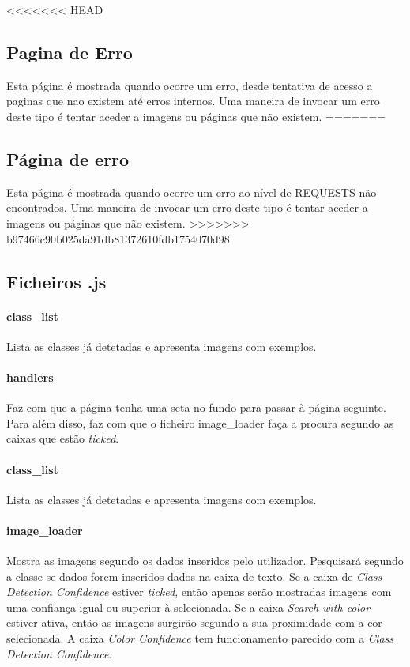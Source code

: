 \documentclass{report}
\begin{document}
<<<<<<< HEAD
\subsection{Pagina de Erro}
Esta página é mostrada quando ocorre um erro, desde tentativa de acesso a paginas que nao existem até erros internos.
Uma maneira de invocar um erro deste tipo é tentar aceder a imagens ou páginas que não existem. 
=======
\subsection{Página de erro}
Esta página é mostrada quando ocorre um erro ao nível de REQUESTS não encontrados. Uma maneira de invocar um erro deste tipo é tentar aceder a imagens ou páginas que não existem. 
>>>>>>> b97466c90b025da91db81372610fdb1754070d98

\subsection{Ficheiros .js}
\paragraph{class\_list}  Lista as classes já detetadas e apresenta imagens com exemplos.
\paragraph{handlers} Faz com que a página tenha uma seta no fundo para passar à página seguinte. Para além disso, faz com que o ficheiro image\_loader faça a procura segundo as caixas que estão \textit{ticked}.
\paragraph{class\_list}  Lista as classes já detetadas e apresenta imagens com exemplos.
\paragraph{image\_loader}Mostra as imagens segundo os dados inseridos pelo utilizador. Pesquisará segundo a classe se dados forem inseridos dados na caixa de texto. Se a caixa de \textit{Class Detection Confidence} estiver \textit{ticked}, então apenas serão mostradas imagens com uma confiança igual ou superior à selecionada. Se a caixa \textit{Search with color} estiver ativa, então as imagens surgirão segundo a sua proximidade com a cor selecionada. A caixa \textit{Color Confidence} tem funcionamento parecido com a \textit{Class Detection Confidence}. 
\end{document}
